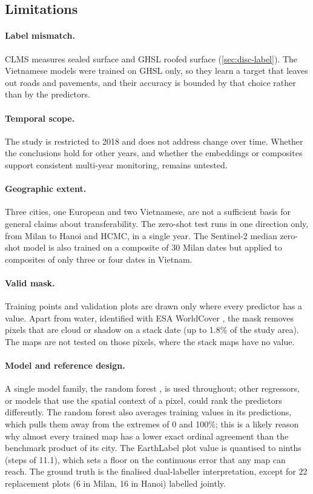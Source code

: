 \subsection{Limitations}
\label{sec:limitations}

\paragraph{Label mismatch.} CLMS measures sealed surface and GHSL roofed
surface (\cref{sec:disc-label}). The Vietnamese models were trained on GHSL
only, so they learn a target that leaves out roads and pavements, and their
accuracy is bounded by that choice rather than by the predictors.

\paragraph{Temporal scope.} The study is restricted to 2018 and does not
address change over time. Whether the conclusions hold for other years,
and whether the embeddings or composites support consistent multi-year
monitoring, remains untested.

\paragraph{Geographic extent.} Three cities, one European and two
Vietnamese, are not a sufficient basis for general claims about
transferability. The zero-shot test runs in one direction only, from Milan
to Hanoi and HCMC, in a single year. The Sentinel-2 median zero-shot model
is also trained on a composite of 30 Milan dates but applied to composites
of only three or four dates in Vietnam.

\paragraph{Valid mask.} Training points and validation plots are drawn only
where every predictor has a value. Apart from water, identified with ESA
WorldCover \cite{zanaga2022worldcover}, the mask removes pixels that are
cloud or shadow on a stack date (up to 1.8\% of the study area). The maps
are not tested on those pixels, where the stack maps have no value.

\paragraph{Model and reference design.} A single model family, the random
forest \cite{breiman2001rf}, is used throughout; other regressors, or
models that use the spatial context of a pixel, could rank the predictors
differently. The random forest also averages training values in its
predictions, which pulls them away from the extremes of 0 and 100\%; this
is a likely reason why almost every trained map has a lower exact ordinal
agreement than the benchmark product of its city. The EarthLabel plot
value is quantised to ninths (steps of 11.1\pp), which sets a floor on the
continuous error that any map can reach. The ground truth is the finalised
dual-labeller interpretation, except for 22 replacement plots (6 in Milan,
16 in Hanoi) labelled jointly.

